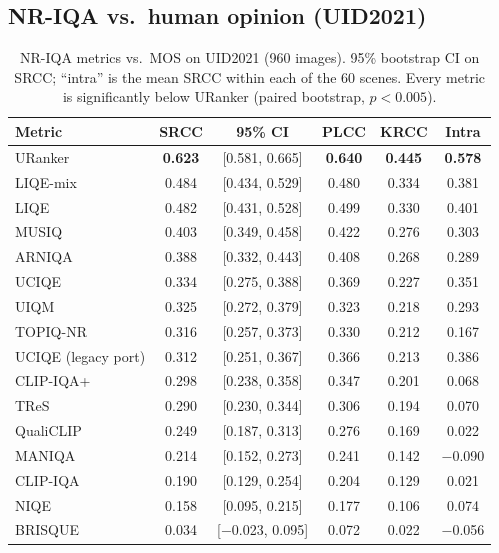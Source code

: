 \documentclass[conference]{IEEEtran}
\begin{document}
\subsection{NR-IQA vs.\ human opinion (UID2021)}
\begin{table}[t]
\centering
\caption{NR-IQA metrics vs.\ MOS on UID2021 (960 images). 95\% bootstrap CI on SRCC; ``intra'' is the mean SRCC within each of the 60 scenes. Every metric is significantly below URanker (paired bootstrap, $p<0.005$).}
\label{tab:o1}
\setlength{\tabcolsep}{3.2pt}
\footnotesize
\begin{tabular}{@{}lccccc@{}}
\toprule
Metric & SRCC & 95\% CI & PLCC & KRCC & Intra \\
\midrule
URanker~\cite{guo2023uranker} & \textbf{0.623} & [0.581, 0.665] & \textbf{0.640} & \textbf{0.445} & \textbf{0.578} \\
LIQE-mix & 0.484 & [0.434, 0.529] & 0.480 & 0.334 & 0.381 \\
LIQE~\cite{zhang2023liqe} & 0.482 & [0.431, 0.528] & 0.499 & 0.330 & 0.401 \\
MUSIQ~\cite{ke2021musiq} & 0.403 & [0.349, 0.458] & 0.422 & 0.276 & 0.303 \\
ARNIQA~\cite{agnolucci2024arniqa} & 0.388 & [0.332, 0.443] & 0.408 & 0.268 & 0.289 \\
UCIQE~\cite{yang2015uciqe} & 0.334 & [0.275, 0.388] & 0.369 & 0.227 & 0.351 \\
UIQM~\cite{panetta2016uiqm} & 0.325 & [0.272, 0.379] & 0.323 & 0.218 & 0.293 \\
TOPIQ-NR~\cite{chen2024topiq} & 0.316 & [0.257, 0.373] & 0.330 & 0.212 & 0.167 \\
UCIQE (legacy port) & 0.312 & [0.251, 0.367] & 0.366 & 0.213 & 0.386 \\
CLIP-IQA+ & 0.298 & [0.238, 0.358] & 0.347 & 0.201 & 0.068 \\
TReS~\cite{golestaneh2022tres} & 0.290 & [0.230, 0.344] & 0.306 & 0.194 & 0.070 \\
QualiCLIP~\cite{agnolucci2024qualiclip} & 0.249 & [0.187, 0.313] & 0.276 & 0.169 & 0.022 \\
MANIQA~\cite{yang2022maniqa} & 0.214 & [0.152, 0.273] & 0.241 & 0.142 & $-$0.090 \\
CLIP-IQA~\cite{wang2023clipiqa} & 0.190 & [0.129, 0.254] & 0.204 & 0.129 & 0.021 \\
NIQE~\cite{mittal2013niqe} & 0.158 & [0.095, 0.215] & 0.177 & 0.106 & 0.074 \\
BRISQUE~\cite{mittal2012brisque} & 0.034 & [$-$0.023, 0.095] & 0.072 & 0.022 & $-$0.056 \\
\bottomrule
\end{tabular}
\end{table}
\end{document}
